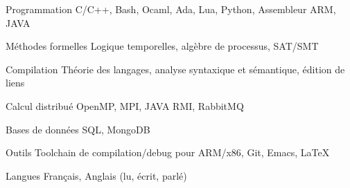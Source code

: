 


\begin{cvskills}


\cvskill
{Programmation} %
{C/C++, Bash, Ocaml, Ada, Lua, Python, Assembleur ARM, JAVA} %


\cvskill
{Méthodes formelles} %
{Logique temporelles, algèbre de processus, SAT/SMT} %


\cvskill
{Compilation}%
{Théorie des langages, analyse syntaxique et sémantique, édition de liens}


\cvskill
{Calcul distribué}%
{OpenMP, MPI, JAVA RMI, RabbitMQ}


\cvskill
{Bases de données}%
{SQL, MongoDB}


\cvskill
{Outils}%
{Toolchain de compilation/debug pour ARM/x86, Git, Emacs, \LaTeX}


\cvskill
{Langues} %
{Français, Anglais (lu, écrit, parlé)} %


\end{cvskills}